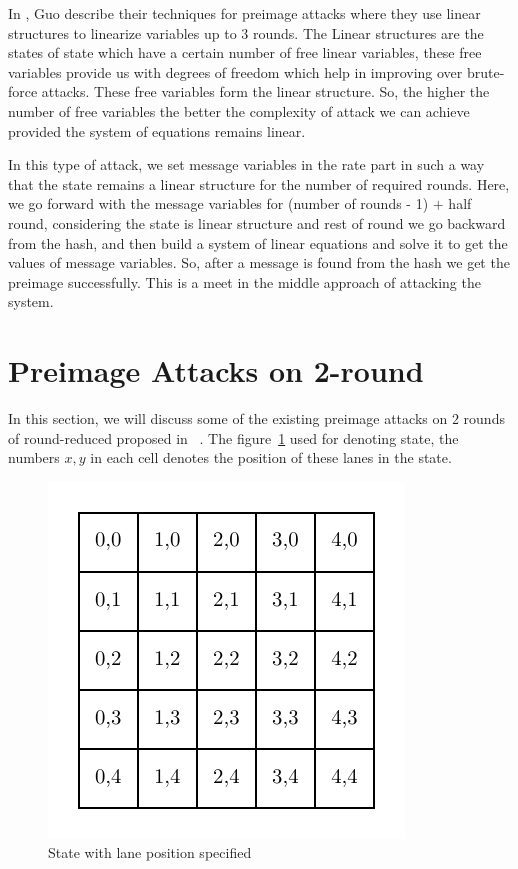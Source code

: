 In \cite{guo2016linear}, Guo \etal describe their techniques for preimage attacks where they use linear structures to linearize variables up to $3$ rounds. The Linear structures are the states of \KECCAK{} state which have a certain number of free linear variables, these free variables provide us with degrees of freedom which help in improving over brute-force attacks. These free variables form the linear structure. So, the higher the number of free variables the better the complexity of attack we can achieve provided the system of equations remains linear.

In this type of attack, we set message variables in the rate part in such a way that the state remains a linear structure for the number of required rounds. Here, we go forward with the message variables for (number of rounds - 1) $+$ half round, considering the state is linear structure and rest of round we go backward from the hash, and then build a system of linear equations and solve it to get the values of message variables. So, after a message is found from the hash we get the preimage successfully. This is a meet in the middle approach of attacking the system.

\section{Preimage Attacks on 2-round \KECCAK}

In this section, we will discuss some of the existing preimage attacks on $2$ rounds of round-reduced \KECCAK{} proposed in ~\cite{guo2016linear}. 
The figure~\ref{fig:linkeccakstate} used for denoting \KECCAK{} state, the numbers $x,y$ in each cell denotes the position of these lanes in the state.

\begin{figure}
    \centering
    \includegraphics{keccakState.pdf}
    \caption{\KECCAK{} State with lane position specified}
    \label{fig:linkeccakstate}
\end{figure}


